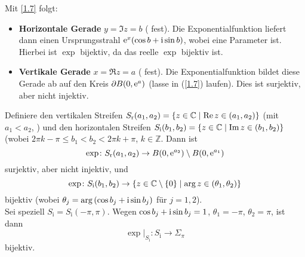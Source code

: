 \documentclass[a4paper,twoside,DIV15,BCOR12mm]{scrbook}
\begin{document}
Mit \eqref{1.7} folgt:

\begin{itemize}
\item {\bf Horizontale Gerade} $y=\Im{z}=b$ ( fest). Die Exponentialfunktion liefert dann einen Ursprungsstrahl
  $\mathrm{e}^x(\cos{b}+\mathrm{i}\sin{b})$, wobei  eine Parameter ist. Hierbei ist $\exp$ bijektiv, da das reelle $\exp$ bijektiv
  ist.
\item {\bf Vertikale Gerade} $x=\Re{z}=a$ ( fest). Die Exponentialfunktion bildet diese Gerade ab auf den Kreis
  $\partial B(0,\mathrm{e}^a)$ (lasse in (\ref{1.7})  laufen). Dies ist surjektiv, aber nicht injektiv.
\end{itemize}

\noindent Definiere den vertikalen Streifen $S_\text{r}(a_1,a_2) = \{z\in\mathbb{C} \mid \operatorname{Re}{z}\in(a_1,a_2)\}$ (mit $a_1<a_2$,
) und den horizontalen Streifen $S_\text{i}(b_1,b_2) = \{z\in\mathbb{C} \mid \operatorname{Im}{z}\in(b_1,b_2)\}$ (wobei $2\pi k-\pi
\leq b_1<b_2 < 2\pi k + \pi$, $k\in\mathbb{Z}$. Dann ist
\[\exp\colon S_\text{r}(a_1,a_2) \to B(0,\mathrm{e}^{a_2})\setminus B(0,\mathrm{e}^{a_1})\]
surjektiv, aber nicht injektiv, und
\[\exp\colon S_\text{i}(b_1,b_2) \to \{z\in\mathbb{C}\setminus\{0\} \mid \arg{z}\in(\theta_1,\theta_2)\}\]
bijektiv (wobei $\theta_j = \arg{(\cos{b_j}+\mathrm{i}\sin{b_j})}$ für $j=1,2$).\\
Sei speziell $S_\text{i}=S_\text{i}(-\pi,\pi)$. Wegen $\cos{b_j}+\mathrm{i}\sin{b_j}=1$, $\theta_1=-\pi$, $\theta_2=\pi$, ist dann
\[\exp|_{S_\text{i}}\colon S_\text{i} \to \Sigma_\pi\] bijektiv.
\end{document}
